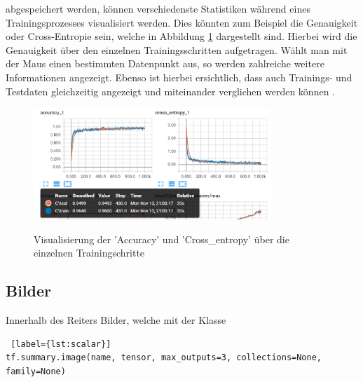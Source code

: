 \vspace{0.2cm}

abgespeichert werden, können verschiedenste Statistiken während eines Trainingsprozesses visualisiert werden. Dies könnten zum Beispiel die Genauigkeit oder Cross-Entropie sein, welche in Abbildung \ref{fig:skalare} dargestellt sind. Hierbei wird die Genauigkeit über den einzelnen Trainingsschritten aufgetragen. Wählt man mit der Maus einen bestimmten Datenpunkt aus, so werden zahlreiche weitere Informationen angezeigt. Ebenso ist hierbei ersichtlich, dass auch Trainings- und Testdaten gleichzeitig angezeigt und miteinander verglichen werden können \cite{tensorboard.2017}.

\begin{figure}[h!]
	\centering
	 \includegraphics[width=0.8\textwidth]{images/Kapitel_3/skalars.png}\\
	\vspace{10pt} 
	\caption[Visualisierung der 'Accuracy' und 'Cross\_entropy' über die einzelnen Trainingsschritte]{Visualisierung der 'Accuracy' und 'Cross\_entropy' über die einzelnen Trainingschritte}
	\label{fig:skalare}
\end{figure}





\subsection{Bilder}

Innerhalb des Reiters Bilder, welche mit der Klasse
\\

\begin{minipage}{\linewidth}
\begin{lstlisting} [label={lst:scalar}]
tf.summary.image(name, tensor, max_outputs=3, collections=None, family=None)
\end{lstlisting}
\end{minipage}


